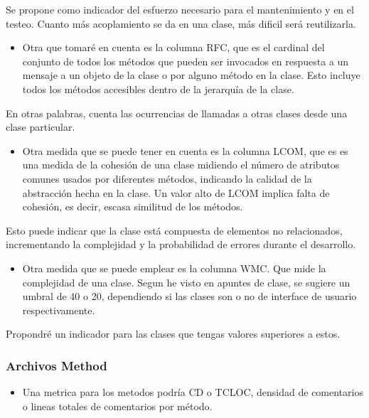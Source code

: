 \documentclass[
]{article}
\providecommand{\tightlist}{%
  \setlength{\itemsep}{0pt}\setlength{\parskip}{0pt}}
\begin{document}
Se propone como indicador del esfuerzo necesario para el mantenimiento y
en el testeo. Cuanto más acoplamiento se da en una clase, más dificil
será reutilizarla.

\begin{itemize}
\tightlist
\item
  Otra que tomaré en cuenta es la columna RFC, que es el cardinal del
  conjunto de todos los métodos que pueden ser invocados en respuesta a
  un mensaje a un objeto de la clase o por alguno método en la clase.
  Esto incluye todos los métodos accesibles dentro de la jerarquía de la
  clase.
\end{itemize}

En otras palabras, cuenta las ocurrencias de llamadas a otras clases
desde una clase particular.

\begin{itemize}
\tightlist
\item
  Otra medida que se puede tener en cuenta es la columna LCOM, que es es
  una medida de la cohesión de una clase midiendo el número de atributos
  comunes usados por diferentes métodos, indicando la calidad de la
  abstracción hecha en la clase. Un valor alto de LCOM implica falta de
  cohesión, es decir, escasa similitud de los métodos.
\end{itemize}

Esto puede indicar que la clase está compuesta de elementos no
relacionados, incrementando la complejidad y la probabilidad de errores
durante el desarrollo.

\begin{itemize}
\tightlist
\item
  Otra medida que se puede emplear es la columna WMC. Que mide la
  complejidad de una clase. Segun he visto en apuntes de clase, se
  sugiere un umbral de 40 o 20, dependiendo si las clases son o no de
  interface de usuario respectivamente.
\end{itemize}

Propondré un indicador para las clases que tengas valores superiores a
estos.

\hypertarget{archivos-method}{%
\subsubsection{Archivos Method}\label{archivos-method}}

\begin{itemize}
\tightlist
\item
  Una metrica para los metodos podría CD o TCLOC, densidad de
  comentarios o lineas totales de comentarios por método.
\end{itemize}
\end{document}
